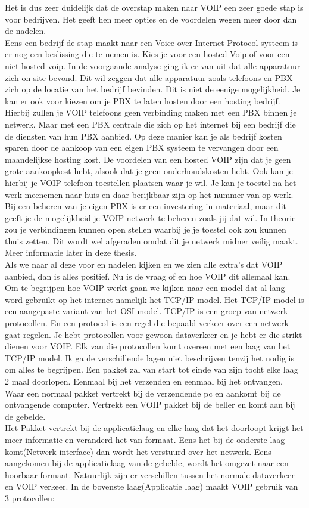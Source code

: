 \documentclass[pdftex,a4paper,12pt,twoside]{report}
\begin{document}
Het is dus zeer duidelijk dat de overstap maken naar VOIP een zeer goede stap is voor bedrijven. Het geeft hen meer opties en de voordelen wegen meer door dan de nadelen. \\
Eens een bedrijf de stap maakt naar een Voice over Internet Protocol systeem is er nog een beslissing die te nemen is. Kies je voor een hosted Voip of voor een niet hosted voip.
In de voorgaande analyse ging ik er van uit dat alle apparatuur zich on site bevond. Dit wil zeggen dat alle apparatuur zoals telefoons en PBX zich op de locatie van het bedrijf bevinden.
Dit is niet de eenige mogelijkheid. Je kan er ook voor kiezen om je PBX te laten hosten door een hosting bedrijf. Hierbij zullen je VOIP telefoons geen verbinding maken met een PBX binnen je netwerk.
Maar met een PBX centrale die zich op het internet bij een bedrijf die de diensten van hun PBX aanbied. Op deze manier kan je als bedrijf kosten sparen door de aankoop van een eigen PBX systeem te vervangen door een maandelijkse hosting kost.
De voordelen van een hosted VOIP zijn dat je geen grote aankoopkost hebt, alsook dat je geen onderhoudskosten hebt. Ook kan je hierbij je VOIP telefoon toestellen plaatsen waar je wil. Je kan je toestel na het werk meenemen naar huis en daar berijkbaar zijn op het nummer van op werk.
Bij een beheren van je eigen PBX is er een investering in materiaal, maar dit geeft je de mogelijkheid je VOIP netwerk te beheren zoals jij dat wil. In theorie zou je verbindingen kunnen open stellen waarbij je je toestel ook zou kunnen thuis zetten. Dit wordt wel afgeraden omdat dit je netwerk midner veilig maakt. Meer informatie later in deze thesis.
\\
Als we naar al deze voor en nadelen kijken en we zien alle extra's dat VOIP aanbied, dan is alles positief. Nu is de vraag of en hoe VOIP dit allemaal kan. Om te begrijpen hoe VOIP werkt gaan we kijken naar een model dat al lang word gebruikt op het internet namelijk het TCP/IP model. Het TCP/IP model is een aangepaste variant van het OSI model.
TCP/IP is een groep van netwerk protocollen. En een protocol is een regel die bepaald verkeer over een netwerk gaat regelen. Je hebt protocollen voor gewoon dataverkeer en je hebt er die strikt dienen voor VOIP. Elk van die protocollen komt overeen met een laag van het TCP/IP model. Ik ga de verschillende lagen niet beschrijven tenzij het nodig is om alles te begrijpen.
Een pakket zal van start tot einde van zijn tocht elke laag 2 maal doorlopen. Eenmaal bij het verzenden en eenmaal bij het ontvangen. Waar een normaal pakket vertrekt bij de verzendende pc en aankomt bij de ontvangende computer. Vertrekt een VOIP pakket bij de beller en komt aan bij de gebelde.\\
Het Pakket vertrekt bij de applicatielaag en elke laag dat het doorloopt krijgt het meer informatie en veranderd het van formaat. Eens het bij de onderste laag komt(Netwerk interface) dan wordt het verstuurd over het netwerk. Eens aangekomen bij de applicatielaag van de gebelde, wordt het omgezet naar een hoorbaar formaat.
\newpage
Natuurlijk zijn er verschillen tussen het normale dataverkeer en VOIP verkeer. In de bovenste laag(Applicatie laag) maakt VOIP gebruik van 3 protocollen:
\end{document}
